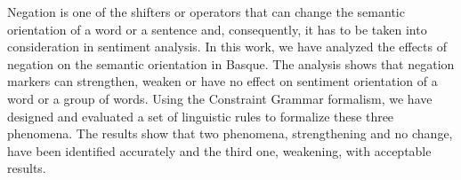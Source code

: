 Negation is one of the shifters or operators that can change the semantic orientation of a word or a sentence and, consequently, it has to be taken into consideration in sentiment analysis. In this work, we have analyzed the effects of negation on the semantic orientation in Basque. The analysis shows that negation markers can strengthen, weaken or have no effect on sentiment orientation of a word or a group of words. Using the Constraint Grammar formalism, we have designed and evaluated a set of linguistic rules to formalize these three phenomena. The results show that two phenomena, strengthening and no change, have been identified accurately and the third one, weakening, with acceptable results.
